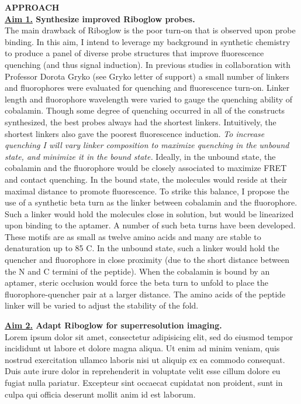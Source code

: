 {\Large \bf APPROACH}\\
{\bf \underline{Aim 1.} Synthesize improved Riboglow probes.}\\
The main drawback of Riboglow is the poor turn-on that is observed upon probe binding. In this aim, I intend to leverage my background in synthetic chemistry to produce a panel of diverse probe structures that improve fluorescence quenching (and thus signal induction). In previous studies in collaboration with Professor Dorota Gryko (see Gryko letter of support) a small number of linkers and fluorophores were evaluated for quenching and fluorescence turn-on. Linker length and fluorophore wavelength were varied to gauge the quenching ability of cobalamin. Though some degree of quenching occurred in all of the constructs synthesized, the best probes always had the shortest linkers. Intuitively, the shortest linkers also gave the poorest fluorescence induction.
\textit{To increase quenching I will vary linker composition to maximize quenching in the unbound state, and minimize it in the bound state.} Ideally, in the unbound state, the cobalamin and the fluorophore would be closely associated to maximize FRET and contact quenching.\cite{LeeDesignSynthesisCharacterization2009} In the bound state, the molecules would reside at their maximal distance to promote fluorescence. To strike this balance, I propose the use of a synthetic beta turn as the linker between cobalamin and the fluorophore. Such a linker would hold the molecules close in solution, but would be linearized upon binding to the aptamer. A number of such beta turns have been developed. These motifs are as small as twelve amino acids and many are stable to denaturation up to 85 C.\cite{KierProbingLowerSize2008} In the unbound state, such a linker would hold the quencher and fluorophore in close proximity (due to the short distance between the N and C termini of the peptide). When the cobalamin is bound by an aptamer, steric occlusion would force the beta turn to unfold to place the fluorophore-quencher pair at a larger distance. The amino acids of the peptide linker will be varied to adjust the stability of the fold.

{\bf \underline{Aim 2.} Adapt Riboglow for superresolution imaging.}\\
Lorem ipsum dolor sit amet, consectetur adipisicing elit, sed do eiusmod tempor incididunt ut labore et dolore magna aliqua. Ut enim ad minim veniam, quis nostrud exercitation ullamco laboris nisi ut aliquip ex ea commodo consequat. Duis aute irure dolor in reprehenderit in voluptate velit esse cillum dolore eu fugiat nulla pariatur. Excepteur sint occaecat cupidatat non proident, sunt in culpa qui officia deserunt mollit anim id est laborum.

